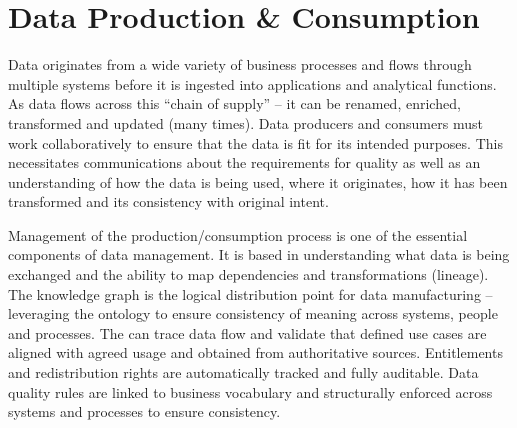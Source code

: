 \section{Data Production \& Consumption}\label{sec:ekgmm-b-4-3} %

Data originates from a wide variety of business processes and flows through multiple systems before it is
ingested into applications and analytical functions.
As data flows across this “chain of supply” -- it can be renamed, enriched, transformed and updated (many times).
Data producers and consumers must work collaboratively to ensure that the data is fit for its intended purposes.
This necessitates communications about the requirements for quality as well as an understanding of
how the data is being used, where it originates, how it has been transformed and its consistency with original intent.

\kgmmekgrationalesection

Management of the production/consumption process is one of the essential components of data management.
It is based in understanding what data is being exchanged and the ability to map dependencies and
transformations (lineage).
The knowledge graph is the logical distribution point for data manufacturing -- leveraging the ontology to ensure
consistency of meaning across systems, people and processes.
The  can trace data flow and validate that defined use cases are aligned with agreed usage and
obtained from authoritative sources.
Entitlements and redistribution rights are automatically tracked and fully auditable.
Data quality rules are linked to business vocabulary and structurally enforced across systems and processes
to ensure consistency.

\kgmmcorequestionssection

